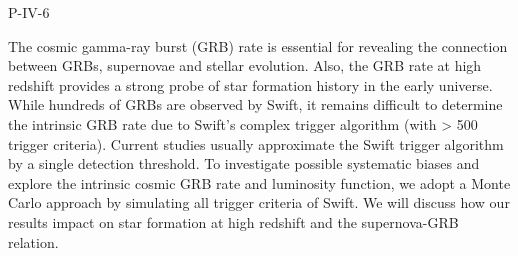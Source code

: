 P-IV-6


\bigskip



\bigskip

\noindent The cosmic gamma-ray burst (GRB) rate is essential for revealing the connection between GRBs, supernovae and stellar evolution. Also, the GRB rate at high redshift provides a strong probe of star formation history in the early universe. While hundreds of GRBs are observed by Swift, it remains difficult to determine the intrinsic GRB rate due to Swift’s complex trigger algorithm (with > 500 trigger criteria). Current studies usually approximate the Swift trigger algorithm by a single detection threshold. To investigate possible systematic biases and explore the intrinsic cosmic GRB rate and luminosity function, we adopt a Monte Carlo approach by simulating all trigger criteria of Swift. We will discuss how our results impact on star formation at high redshift and the supernova-GRB relation.

